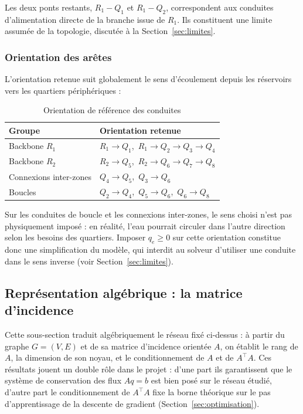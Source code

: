 \documentclass[11pt]{ama-article}
\begin{document}
Les deux ponts restants, $R_1\!-\!Q_1$ et $R_1\!-\!Q_2$, correspondent aux conduites
d'alimentation directe de la branche issue de $R_1$. Ils constituent une limite assumée de la
topologie, discutée à la Section~\ref{sec:limites}.

\subsubsection{Orientation des arêtes}
\label{sec:orientation}

L'orientation retenue suit globalement le sens d'écoulement depuis les réservoirs vers les
quartiers périphériques :

\begin{table}[h!]
\centering
\begin{tabular}{>{\raggedright\arraybackslash}p{4cm}>{\raggedright\arraybackslash}p{9cm}}
\toprule
\textbf{Groupe} & \textbf{Orientation retenue} \\
\midrule
Backbone $R_1$ & $R_1\to Q_1$,\ $R_1\to Q_2\to Q_3\to Q_4$ \\
Backbone $R_2$ & $R_2\to Q_5$,\ $R_2\to Q_6\to Q_7\to Q_8$ \\
Connexions inter-zones & $Q_4\to Q_5$,\ $Q_3\to Q_6$ \\
Boucles & $Q_2\to Q_4$,\ $Q_5\to Q_6$,\ $Q_6\to Q_8$ \\
\bottomrule
\end{tabular}
\caption{Orientation de référence des conduites}
\end{table}

Sur les conduites de boucle et les connexions inter-zones, le sens choisi n'est pas
physiquement imposé : en réalité, l'eau pourrait circuler dans l'autre direction selon les
besoins des quartiers. Imposer $q_e \ge 0$ sur cette orientation constitue donc une
simplification du modèle, qui interdit au solveur d'utiliser une conduite dans le sens
inverse (voir Section~\ref{sec:limites}).

\subsection{Représentation algébrique : la matrice d'incidence}
\label{sec:algebre}

Cette sous-section traduit algébriquement le réseau fixé ci-dessus : à partir du graphe
$G=(V,E)$ et de sa matrice d'incidence orientée $A$, on établit le rang de $A$, la dimension de
son noyau, et le conditionnement de $A$ et de $A^\top A$. Ces résultats jouent un double rôle
dans le projet : d'une part ils garantissent que le système de conservation des flux $Aq=b$ est
bien posé sur le réseau étudié, d'autre part le conditionnement de $A^\top A$ fixe la borne
théorique sur le pas d'apprentissage de la descente de gradient (Section~\ref{sec:optimisation}).
\end{document}
